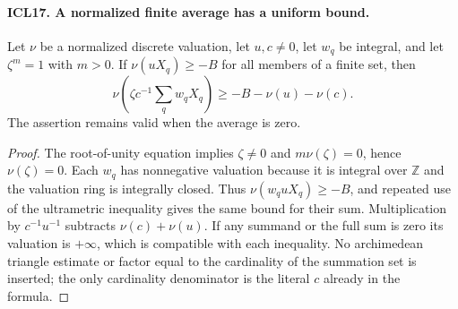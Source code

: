 \documentclass[11pt,a4paper]{article}
\numberwithin{equation}{section}
\theoremstyle{remark}\newtheorem{remark}[theorem]{Remark}
\begin{document}
\paragraph{ICL17. A normalized finite average has a uniform bound.}
\label{claim:ICL17}
Let \(\nu\) be a normalized discrete valuation, let
\(u,c\ne0\), let \(w_q\) be integral, and let
\(\zeta^m=1\) with \(m>0\).  If
\(\nu(uX_q)\geq-B\) for all members of a finite set,
then
\[
 \nu\left(\zeta c^{-1}\sum_qw_qX_q\right)
                 \geq-B-\nu(u)-\nu(c).                \tag{ICL.16}
\]
The assertion remains valid when the average is zero.
\begin{proof}
The root-of-unity equation implies \(\zeta\ne0\) and
\(m\nu(\zeta)=0\), hence \(\nu(\zeta)=0\).
Each \(w_q\) has nonnegative valuation because it is
integral over \(\mathbb Z\) and the valuation ring is
integrally closed.  Thus
\(\nu(w_quX_q)\geq-B\), and repeated use of the
ultrametric inequality gives the same bound for their
sum.  Multiplication by \(c^{-1}u^{-1}\) subtracts
\(\nu(c)+\nu(u)\).  If any summand or the full sum
is zero its valuation is \(+\infty\), which is
compatible with each inequality.  No archimedean
triangle estimate or factor equal to the cardinality
of the summation set is inserted; the only cardinality
denominator is the literal \(c\) already in the formula.
\end{proof}

\end{document}
